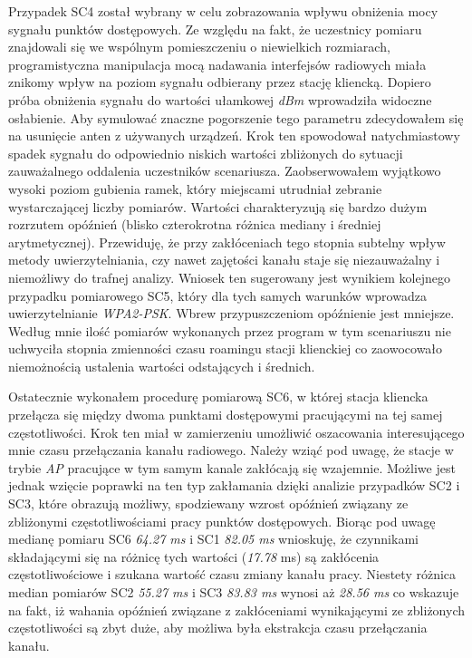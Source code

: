 Przypadek SC4 został wybrany w celu zobrazowania wpływu obniżenia mocy sygnału punktów dostępowych. Ze względu na fakt, że uczestnicy pomiaru znajdowali się we wspólnym pomieszczeniu o niewielkich rozmiarach, programistyczna manipulacja mocą nadawania interfejsów radiowych miała znikomy wpływ na poziom sygnału odbierany przez stację kliencką. Dopiero próba obniżenia sygnału do wartości ułamkowej \emph{dBm} wprowadziła widoczne osłabienie. Aby symulować znaczne pogorszenie tego parametru zdecydowałem się na usunięcie anten z używanych urządzeń. Krok ten spowodował natychmiastowy spadek sygnału do odpowiednio niskich wartości zbliżonych do sytuacji zauważalnego oddalenia uczestników scenariusza. Zaobserwowałem wyjątkowo wysoki poziom gubienia ramek, który miejscami utrudniał zebranie wystarczającej liczby pomiarów. Wartości charakteryzują się bardzo dużym rozrzutem opóźnień (blisko czterokrotna różnica mediany i średniej arytmetycznej). Przewiduję, że przy zakłóceniach tego stopnia subtelny wpływ metody uwierzytelniania, czy nawet zajętości kanału staje się niezauważalny i niemożliwy do trafnej analizy. Wniosek ten sugerowany jest wynikiem kolejnego przypadku pomiarowego SC5, który dla tych samych warunków wprowadza uwierzytelnianie \emph{WPA2-PSK}. Wbrew przypuszczeniom opóźnienie jest mniejsze. Według mnie ilość pomiarów wykonanych przez program w tym scenariuszu nie uchwyciła stopnia zmienności czasu roamingu stacji klienckiej co zaowocowało niemożnością ustalenia wartości odstających i średnich. 

Ostatecznie wykonałem procedurę pomiarową SC6, w której stacja kliencka przełącza się między dwoma punktami dostępowymi pracującymi na tej samej częstotliwości. Krok ten miał w zamierzeniu umożliwić oszacowania interesującego mnie czasu przełączania kanału radiowego. Należy wziąć pod uwagę, że stacje w trybie \emph{AP} pracujące w tym samym kanale zakłócają się wzajemnie. Możliwe jest jednak wzięcie poprawki na ten typ zakłamania dzięki analizie przypadków SC2 i SC3, które obrazują możliwy, spodziewany wzrost opóźnień związany ze zbliżonymi częstotliwościami pracy punktów dostępowych. Biorąc pod uwagę medianę pomiaru SC6 \emph{64.27 ms} i SC1 \emph{82.05 ms} wnioskuję, że czynnikami składającymi się na różnicę tych wartości (\emph{17.78} ms) są zakłócenia częstotliwościowe i szukana wartość czasu zmiany kanału pracy. Niestety różnica median pomiarów SC2 \emph{55.27 ms} i SC3 \emph{83.83 ms} wynosi aż \emph{28.56 ms} co wskazuje na fakt, iż wahania opóźnień związane z zakłóceniami wynikającymi ze zbliżonych częstotliwości są zbyt duże, aby możliwa była ekstrakcja czasu przełączania kanału. 

